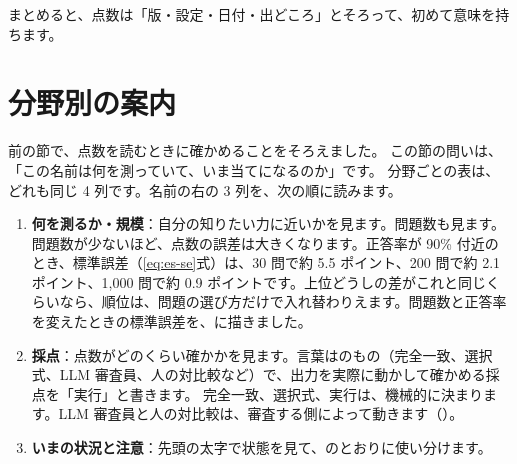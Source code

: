 まとめると、点数は「版・設定・日付・出どころ」とそろって、初めて意味を持ちます。

\section{分野別の案内}\label{sec:bm-fields}


前の節で、点数を読むときに確かめることをそろえました。
この節の問いは、「この名前は何を測っていて、いま当てになるのか」です。
分野ごとの表は、どれも同じ 4 列です。名前の右の 3 列を、次の順に読みます。
\begin{enumerate}[leftmargin=2em,nosep]
  \item \textbf{何を測るか・規模}：自分の知りたい力に近いかを見ます。問題数も見ます。問題数が少ないほど、点数の誤差は大きくなります。正答率が 90\% 付近のとき、標準誤差（\eqref{eq:es-se}式）は、30 問で約 5.5 ポイント、200 問で約 2.1 ポイント、1,000 問で約 0.9 ポイントです。上位どうしの差がこれと同じくらいなら、順位は、問題の選び方だけで入れ替わりえます。問題数と正答率を変えたときの標準誤差を、に描きました。
  \item \textbf{採点}：点数がどのくらい確かかを見ます。言葉はのもの（完全一致、選択式、LLM 審査員、人の対比較など）で、出力を実際に動かして確かめる採点を「実行」と書きます。
    完全一致、選択式、実行は、機械的に決まります。LLM 審査員と人の対比較は、審査する側によって動きます（）。
  \item \textbf{いまの状況と注意}：先頭の太字で状態を見て、のとおりに使い分けます。
\end{enumerate}
